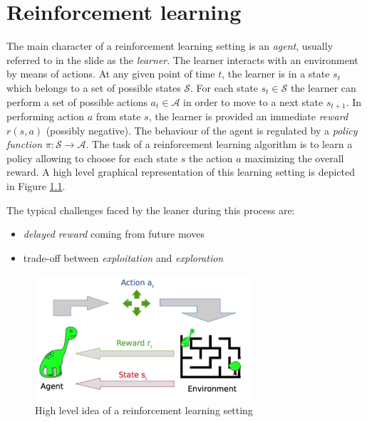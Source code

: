 \chapter{Reinforcement learning}
\label{cha:reinforcement}

The main character of a reinforcement learning setting is an \textit{agent},
usually referred to in the slide as the \textit{learner}. The learner interacts
with an environment by means of actions. At any given point of time $t$, the
learner is in a state $s_{t}$ which belongs to a set of possible states
$\mathcal{S}$. For each state $s_{t} \in \mathcal{S}$ the learner can perform a set
of possible actions $a_{t} \in \mathcal{A}$ in order to move to a next state $s_{t+1}$.
In performing action $a$ from state $s$, the learner is provided an immediate \textit{reward}
$r(s,a)$ (possibly negative). The behaviour of the agent is regulated by a \textit{policy
function} $\pi: \mathcal{S}\rightarrow \mathcal{A}$. The task of a reinforcement
learning algorithm is to learn a policy allowing to choose for each state $s$ the
action $a$ maximizing the overall reward. A high level graphical representation
of this learning setting is depicted in Figure \ref{fig:reinforcementLearning}.
\newline

The typical challenges faced by the leaner during this process are:
\begin{itemize}
	\item \textit{delayed reward} coming from future moves

	\item trade-off between \textit{exploitation} and \textit{exploration}
\end{itemize}

\begin{figure}[H]
	\centering
	\includegraphics[width=0.72\textwidth]{
		images/19_ReinforcementLearning_reinforcementLearning.png
	}
	\caption{High level idea of a reinforcement learning setting}
	\label{fig:reinforcementLearning}
\end{figure}

